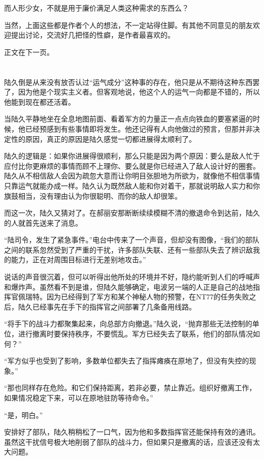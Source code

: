 而人形少女，不就是用于廉价满足人类这种需求的东西么？

当然，上面这些都是作者个人的想法，不一定站得住脚。有其他不同意见的朋友欢迎提出讨论，交流好几把怪的性癖，是作者最喜欢的。

正文在下一页。

\section*{}

陆久倒是从来没有放否认过“运气成分”这种事的存在，他只是从不期待这种东西罢了，因为他是个现实主义者。但客观地说，他这个人的运气一向都是不错的，所以他能到现在都还活着。

当陆久平静地坐在全息地图前面、看着军方的力量正一点点向铁血的要塞紧逼的时候，他已经预感到有些事情即将发生。他还记得有人向他做过的预言，但那并非决定性的原因，真正的原因是陆久感觉一切都进展得太顺利了。

陆久的逻辑是：如果你进展得很顺利，那么只能是因为两个原因：要么是敌人忙于应付比你更麻烦的事情而顾不上理你、要么就是你已经进入了敌人设计好的圈套。陆久从不相信敌人会因为疏忽大意而让你明目张胆地为所欲为，就像他不相信事情只靠运气就能办成一样。陆久认为既然敌人能和你对着干，那就说明敌人实力和你旗鼓相当，没有理由认为你很聪明、而你的敌人却很笨。

而这一次，陆久又猜对了。在郝丽安那断断续续模糊不清的撤退命令到达前，陆久的人就首先送来了消息。

“陆司令，发生了紧急事件。”电台中传来了一个声音，但却没有图像，“我们的部队之间的联系忽然受到了严重的干扰，许多部队失联、还有一些部队失去了辨识敌我的能力，正在对周围目标进行无差别地攻击。”

说话的声音很沉着，但可以听得出他所处的环境并不好，隐约能听到人们的呼喊声和爆炸声。虽然看不到是谁，但陆久能够确定，电波另一端的人正是自己的战地指挥官佩瑞特。因为已经得到了军方和某个神秘人物的预警，在NT77的任务失败之后，陆久已经事先在手下的指挥官之间部署了几条备用线路。

“将手下的战斗力都聚集起来，向总部方向撤退。”陆久说，“抛弃那些无法控制的单位，进行撤离时要保持秩序，不要慌乱。军方已经失去了联系，他们的部队情况如何？”

“军方似乎也受到了影响，多数单位都失去了指挥瘫痪在原地了，但没有失控的现象。”

“那也同样存在危险。和它们保持距离，若非必要，禁止靠近。组织好撤离工作，如果情况稳定下来，可以在原地驻防等待命令。”

“是，明白。”

安排好了部队，陆久稍稍松了一口气，因为他和多数指挥官还能保持有效的通讯。虽然这干扰信号极大地削弱了部队的战斗力，但如果只是撤离的话，应该还没有太大问题。

